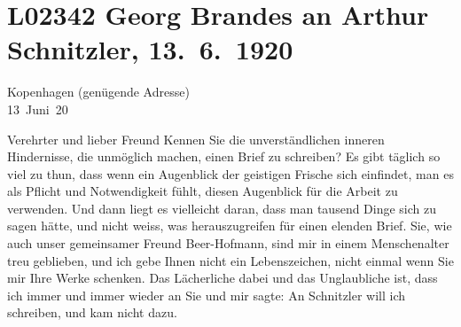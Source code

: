 

\section[Georg Brandes an Arthur Schnitzler, 13. 6. 1920]{L02342 Georg Brandes an Arthur Schnitzler, 13. 6. 1920}
\nopagebreak{}
\rehead{ }\normalsize\beginnumbering{}
\toendnotes[C]{\smallbreak\pagebreak[2]}
\toendnotes[C]{\smallbreak}
\pstart
           \raggedleft{}{\pb}Kopenhagen (genügende Adresse){\\}13 Juni 20\pend
           
\pstart{}Verehrter und lieber Freund \pend\vspace{0.5em}
\pstart
           Kennen Sie die unverständlichen inneren Hindernisse, die \label{T_L02342-1v}\label{T_L02342-1} unmöglich machen,
               einen Brief zu schreiben? Es gibt täglich so viel zu thun, dass wenn ein Augenblick
               der geistigen Frische sich einfindet, man es als Pflicht und Notwendigkeit fühlt,
               diesen Augenblick für die Arbeit zu verwenden. Und dann liegt es vielleicht daran,
               dass man tausend Dinge sich zu sagen hätte, und nicht weiss, was herauszugreifen für
               einen elenden Brief. Sie, wie auch unser gemeinsamer Freund Beer-Hofmann, sind mir in einem Menschenalter treu geblieben,
               und ich gebe Ihnen nicht ein Lebenszeichen, nicht einmal wenn Sie mir Ihre Werke
               schenken. Das Lächerliche dabei und das Unglaubliche ist, {\pb}dass ich immer und immer wieder an
               Sie \label{T_L02342-2v}\label{T_L02342-2} und mir sagte: An Schnitzler will ich schreiben,
               und kam nicht dazu.\pend
           
